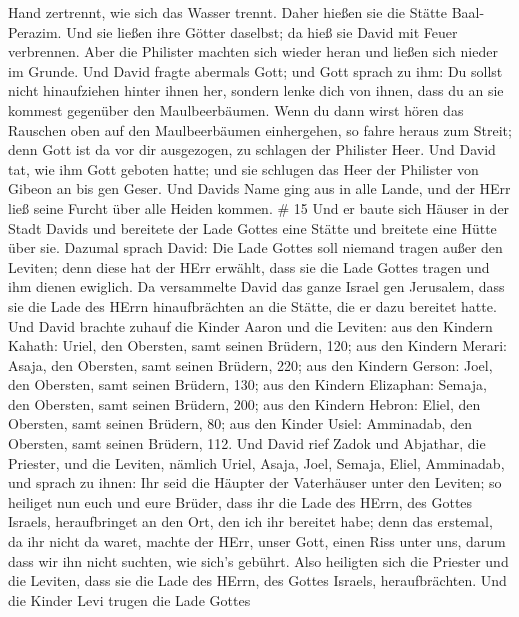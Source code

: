 Hand zertrennt, wie sich das Wasser trennt. Daher hießen sie die Stätte
Baal-Perazim.  Und sie ließen ihre Götter daselbst; da hieß
sie David mit Feuer verbrennen.  Aber die Philister machten
sich wieder heran und ließen sich nieder im Grunde.  Und
David fragte abermals Gott; und Gott sprach zu ihm: Du sollst nicht
hinaufziehen hinter ihnen her, sondern lenke dich von ihnen, dass du an
sie kommest gegenüber den Maulbeerbäumen.  Wenn du dann
wirst hören das Rauschen oben auf den Maulbeerbäumen einhergehen, so
fahre heraus zum Streit; denn Gott ist da vor dir ausgezogen, zu
schlagen der Philister Heer.  Und David tat, wie ihm Gott
geboten hatte; und sie schlugen das Heer der Philister von Gibeon an bis
gen Geser.  Und Davids Name ging aus in alle Lande, und der
HErr ließ seine Furcht über alle Heiden kommen. \# 15  Und
er baute sich Häuser in der Stadt Davids und bereitete der Lade Gottes
eine Stätte und breitete eine Hütte über sie.  Dazumal
sprach David: Die Lade Gottes soll niemand tragen außer den Leviten;
denn diese hat der HErr erwählt, dass sie die Lade Gottes tragen und ihm
dienen ewiglich.  Da versammelte David das ganze Israel gen
Jerusalem, dass sie die Lade des HErrn hinaufbrächten an die Stätte, die
er dazu bereitet hatte.  Und David brachte zuhauf die Kinder
Aaron und die Leviten:  aus den Kindern Kahath: Uriel, den
Obersten, samt seinen Brüdern, 120;  aus den Kindern Merari:
Asaja, den Obersten, samt seinen Brüdern, 220;  aus den
Kindern Gerson: Joel, den Obersten, samt seinen Brüdern, 130;
 aus den Kindern Elizaphan: Semaja, den Obersten, samt
seinen Brüdern, 200;  aus den Kindern Hebron: Eliel, den
Obersten, samt seinen Brüdern, 80;  aus den Kinder Usiel:
Amminadab, den Obersten, samt seinen Brüdern, 112.  Und
David rief Zadok und Abjathar, die Priester, und die Leviten, nämlich
Uriel, Asaja, Joel, Semaja, Eliel, Amminadab,  und sprach
zu ihnen: Ihr seid die Häupter der Vaterhäuser unter den Leviten; so
heiliget nun euch und eure Brüder, dass ihr die Lade des HErrn, des
Gottes Israels, heraufbringet an den Ort, den ich ihr bereitet habe;
 denn das erstemal, da ihr nicht da waret, machte der HErr,
unser Gott, einen Riss unter uns, darum dass wir ihn nicht suchten, wie
sich's gebührt.  Also heiligten sich die Priester und die
Leviten, dass sie die Lade des HErrn, des Gottes Israels,
heraufbrächten.  Und die Kinder Levi trugen die Lade Gottes
